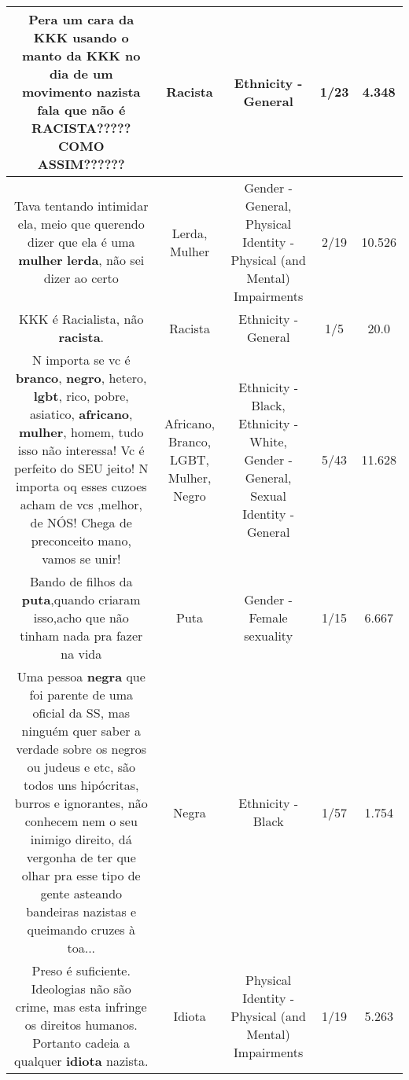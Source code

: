 \documentclass[11pt]{article}
\newlength\mylength
\begin{document}
\begin{center}
\begin{longtable}{|C{.65\mylength}|C{.30\mylength}|C{.12\mylength}|C{.12\mylength}|C{.12\mylength}|}
  \small Pera um cara da KKK usando o manto da KKK no dia de um movimento nazista fala que não é \textbf{RACISTA}????? COMO ASSIM??????\normalsize   & Racista & Ethnicity - General & 1/23 & 4.348 \\  \hline
  \small Tava tentando intimidar ela, meio que querendo dizer que ela é uma \textbf{mulher} \textbf{lerda}, não sei dizer ao certo\normalsize   & Lerda, Mulher & Gender - General, Physical Identity - Physical (and Mental) Impairments & 2/19 & 10.526 \\  \hline
  \small KKK é Racialista, não \textbf{racista}.\normalsize   & Racista & Ethnicity - General & 1/5 & 20.0 \\  \hline
  \small N importa se vc é \textbf{branco}, \textbf{negro}, hetero, \textbf{lgbt}, rico, pobre, asiatico, \textbf{africano}, \textbf{mulher}, homem, tudo isso não interessa! Vc é perfeito do SEU jeito! N importa oq esses cuzoes acham de vcs ,melhor, de NÓS! Chega de preconceito mano, vamos se unir!\normalsize   & Africano, Branco, LGBT, Mulher, Negro & Ethnicity - Black, Ethnicity - White, Gender - General, Sexual Identity - General & 5/43 & 11.628 \\  \hline
  \small Bando de filhos da \textbf{puta},quando criaram isso,acho que não tinham nada pra fazer na vida\normalsize   & Puta & Gender - Female sexuality & 1/15 & 6.667 \\  \hline
  \small Uma pessoa \textbf{negra} que foi parente de uma oficial da SS, mas ninguém quer saber a verdade sobre os negros ou judeus e etc, são todos uns hipócritas, burros e ignorantes, não conhecem nem o seu inimigo direito, dá vergonha de ter que olhar pra esse tipo de gente asteando bandeiras nazistas e queimando cruzes à toa...\normalsize   & Negra & Ethnicity - Black & 1/57 & 1.754 \\  \hline
  \small Preso é suficiente. Ideologias não são crime, mas esta infringe os direitos humanos. Portanto cadeia a qualquer \textbf{idiota} nazista.\normalsize   & Idiota & Physical Identity - Physical (and Mental) Impairments & 1/19 & 5.263 \\  \hline

\end{longtable}
\end{center}
\end{document}
